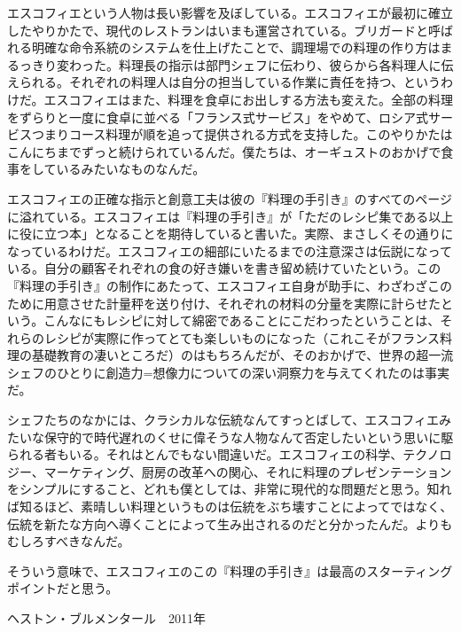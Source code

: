 \begin{main}
エスコフィエという人物は長い影響を及ぼしている。エスコフィエが最初に確立したやりかたで、現代のレストランはいまも運営されている。ブリガードと呼ばれる明確な命令系統のシステムを仕上げたことで、調理場での料理の作り方はまるっきり変わった。料理長の指示は部門シェフに伝わり、彼らから各料理人に伝えられる。それぞれの料理人は自分の担当している作業に責任を持つ、というわけだ。エスコフィエはまた、料理を食卓にお出しする方法も変えた。全部の料理をずらりと一度に食卓に並べる「フランス式サービス」をやめて、ロシア式サービスつまりコース料理が順を追って提供される方式を支持した。このやりかたはこんにちまでずっと続けられているんだ。僕たちは、オーギュストのおかげで食事をしているみたいなものなんだ。

エスコフィエの正確な指示と創意工夫は彼の『料理の手引き』のすべてのページに溢れている。エスコフィエは『料理の手引き』が「ただのレシピ集である以上に役に立つ本」となることを期待していると書いた。実際、まさしくその通りになっているわけだ。エスコフィエの細部にいたるまでの注意深さは伝説になっている。自分の顧客それぞれの食の好き嫌いを書き留め続けていたという。この『料理の手引き』の制作にあたって、エスコフィエ自身が助手に、わざわざこのために用意させた計量秤を送り付け、それぞれの材料の分量を実際に計らせたという。こんなにもレシピに対して綿密であることにこだわったということは、それらのレシピが実際に作ってとても楽しいものになった（これこそがフランス料理の基礎教育の凄いところだ）のはもちろんだが、そのおかげで、世界の超一流シェフのひとりに創造力=想像力についての深い洞察力を与えてくれたのは事実だ。

シェフたちのなかには、クラシカルな伝統なんてすっとばして、エスコフィエみたいな保守的で時代遅れのくせに偉そうな人物なんて否定したいという思いに駆られる者もいる。それはとんでもない間違いだ。エスコフィエの科学、テクノロジー、マーケティング、厨房の改革への関心、それに料理のプレゼンテーションをシンプルにすること、どれも僕としては、非常に現代的な問題だと思う。知れば知るほど、素晴しい料理というものは伝統をぶち壊すことによってではなく、伝統を新たな方向へ導くことによって生み出されるのだと分かったんだ。よりもむしろすべきなんだ。

\thispagestyle{empty}

そういう意味で、エスコフィエのこの『料理の手引き』は最高のスターティングポイントだと思う。

\vspace{1\zw}
\begin{flushright}
ヘストン・ブルメンタール　2011年
\end{flushright}

\end{main}
